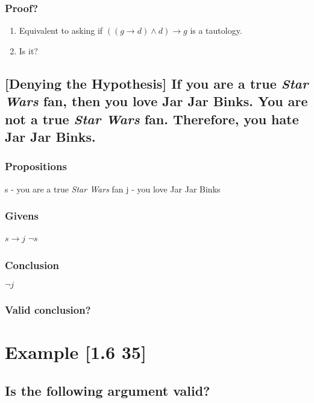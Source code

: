 \documentclass[11pt]{article}
\begin{document}
\subsubsection{Proof?}
\label{sec:org5360cda}
\begin{enumerate}
\item Equivalent to asking if \(((g \rightarrow d) \land d) \rightarrow g\) is a tautology.
\label{sec:org610a98b}
\item Is it?
\label{sec:org7c4925d}
\end{enumerate}

\subsection{[Denying the Hypothesis] If you are a true \emph{Star Wars} fan, then you love Jar Jar Binks. You are not a true \emph{Star Wars} fan. Therefore, you hate Jar Jar Binks.}
\label{sec:org448940d}

\subsubsection{Propositions}
\label{sec:org7767424}
s - you are a true \emph{Star Wars} fan
j - you love Jar Jar Binks
\subsubsection{Givens}
\label{sec:orgaa23e9b}
\(s \rightarrow j\)
\(\lnot s\)
\subsubsection{Conclusion}
\label{sec:orge23270a}
\(\lnot j\)
\subsubsection{Valid conclusion?}
\label{sec:org12cf585}

\section{Example [1.6 35]}
\label{sec:orgd2710b9}
\subsection{Is the following argument valid?}
\label{sec:org34d1030}
\end{document}
